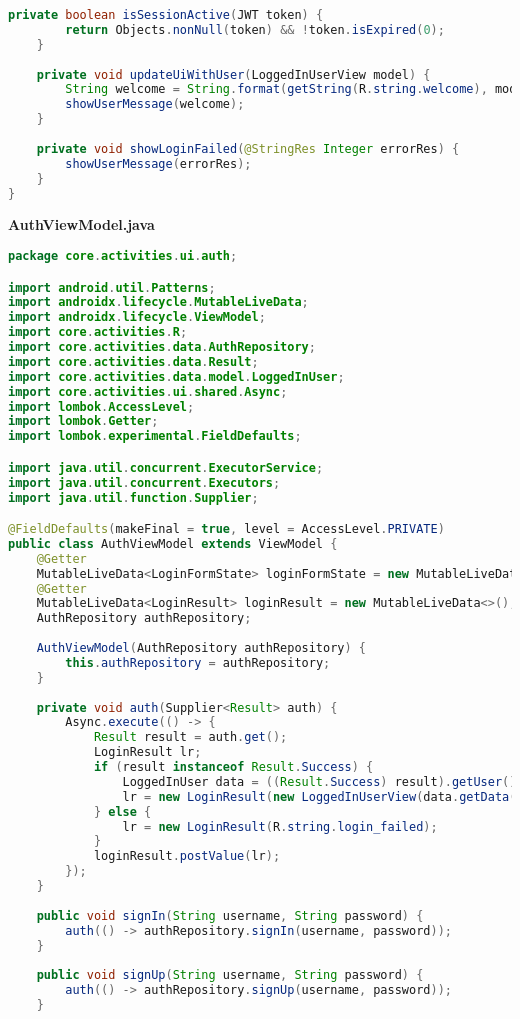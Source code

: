 \begin{lstlisting}[language=Java]
	private boolean isSessionActive(JWT token) {
		return Objects.nonNull(token) && !token.isExpired(0);
	}
	
	private void updateUiWithUser(LoggedInUserView model) {
		String welcome = String.format(getString(R.string.welcome), model.getDisplayName());
		showUserMessage(welcome);
	}
	
	private void showLoginFailed(@StringRes Integer errorRes) {
		showUserMessage(errorRes);
	}
}	

\end{lstlisting}

\textbf{AuthViewModel.java}
\begin{lstlisting}[language=Java]
package core.activities.ui.auth;

import android.util.Patterns;
import androidx.lifecycle.MutableLiveData;
import androidx.lifecycle.ViewModel;
import core.activities.R;
import core.activities.data.AuthRepository;
import core.activities.data.Result;
import core.activities.data.model.LoggedInUser;
import core.activities.ui.shared.Async;
import lombok.AccessLevel;
import lombok.Getter;
import lombok.experimental.FieldDefaults;

import java.util.concurrent.ExecutorService;
import java.util.concurrent.Executors;
import java.util.function.Supplier;

@FieldDefaults(makeFinal = true, level = AccessLevel.PRIVATE)
public class AuthViewModel extends ViewModel {
	@Getter
	MutableLiveData<LoginFormState> loginFormState = new MutableLiveData<>();
	@Getter
	MutableLiveData<LoginResult> loginResult = new MutableLiveData<>();
	AuthRepository authRepository;
	
	AuthViewModel(AuthRepository authRepository) {
		this.authRepository = authRepository;
	}
	
	private void auth(Supplier<Result> auth) {
		Async.execute(() -> {
			Result result = auth.get();
			LoginResult lr;
			if (result instanceof Result.Success) {
				LoggedInUser data = ((Result.Success) result).getUser();
				lr = new LoginResult(new LoggedInUserView(data.getData().getMember(), data.getJwt(), data.getData().getAvatar()));
			} else {
				lr = new LoginResult(R.string.login_failed);
			}
			loginResult.postValue(lr);
		});
	}
	
	public void signIn(String username, String password) {
		auth(() -> authRepository.signIn(username, password));
	}
	
	public void signUp(String username, String password) {
		auth(() -> authRepository.signUp(username, password));
	}
	

\end{lstlisting}
